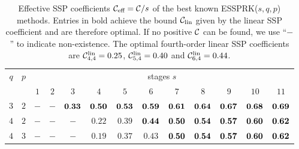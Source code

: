 \begin{table}
\caption{Effective SSP coefficients $ \mathcal{C}_{\text{eff}} = \mathcal{C}/s$ of the best known
      ESSPRK($s,q,p$) methods.
    		Entries in bold achieve the bound $\mathcal{C}_{\text{lin}}$ given by the linear SSP coefficient and are therefore optimal. 
    		If no positive $\mathcal{C}$ can be found, we use ``$-$'' to indicate non-existence. 
    		The optimal fourth-order linear SSP coefficients are $\mathcal{C}^{\textnormal{lin}}_{4,4}=0.25$,
    		$\mathcal{C}^{\textnormal{lin}}_{5,4}=0.40$ and $\mathcal{C}^{\textnormal{lin}}_{6,4}=0.44$.}
    \centering
    \begin{tabular}{ccccccccccccc}
        \toprule
        \multirow{2}{*}{$q$} &
        \multirow{2}{*}{$p$}
            & \multicolumn{11}{c}{stages $s$} \\
            \cmidrule{3-13}
& & $1$ & $2$ & $3$ & $4$ & $5$ & $6$ & $7$ & $8$ & $9$ & $10$ & $11$ \\
        \midrule
        $3$ & $2$ & $-$ & $-$ & $\bf 0.33$ & $\bf 0.50$ & $\bf 0.53$ & $\bf 0.59$ & $\bf 0.61$ & $\bf 0.64$ & $\bf 0.67$ & $\bf 0.68$ & $\bf 0.69$\\
        $4$ & $2$ & $-$ & $-$ & $-$ & $0.22$ & $0.39$ & $\bf 0.44$ & $\bf 0.50$ & $\bf 0.54$ & $\bf 0.57$ & $\bf 0.60$ & $\bf 0.62$ \\
        $4$ & $3$ & $-$ & $-$ & $-$ & $0.19$ & $0.37$ & $0.43$ & $\bf 0.50$ & $\bf 0.54$ & $\bf 0.57$ & $\bf 0.60$ & $\bf 0.62$ \\
        \bottomrule
    \end{tabular}
    \label{tab:eff_SSP_coeff}
\end{table}

